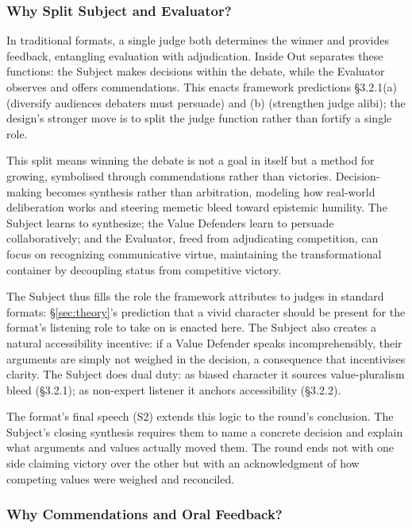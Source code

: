 \subsubsection{Why Split Subject and Evaluator?}

In traditional formats, a single judge both determines the winner and provides feedback, entangling evaluation with adjudication. Inside Out separates these functions: the Subject makes decisions within the debate, while the Evaluator observes and offers commendations. This enacts framework predictions §3.2.1(a) (diversify audiences debaters must persuade) and (b) (strengthen judge alibi); the design's stronger move is to split the judge function rather than fortify a single role.

This split means winning the debate is not a goal in itself but a method for growing, symbolised through commendations rather than victories. Decision-making becomes synthesis rather than arbitration, modeling how real-world deliberation works and steering memetic bleed toward epistemic humility. The Subject learns to synthesize; the Value Defenders learn to persuade collaboratively; and the Evaluator, freed from adjudicating competition, can focus on recognizing communicative virtue, maintaining the transformational container by decoupling status from competitive victory.

The Subject thus fills the role the framework attributes to judges in standard formats: \S\ref{sec:theory}'s prediction that a vivid character should be present for the format's listening role to take on is enacted here. The Subject also creates a natural accessibility incentive: if a Value Defender speaks incomprehensibly, their arguments are simply not weighed in the decision, a consequence that incentivises clarity. The Subject does dual duty: as biased character it sources value-pluralism bleed (§3.2.1); as non-expert listener it anchors accessibility (§3.2.2).

The format's final speech (S2) extends this logic to the round's conclusion. The Subject's closing synthesis requires them to name a concrete decision and explain what arguments and values actually moved them. The round ends not with one side claiming victory over the other but with an acknowledgment of how competing values were weighed and reconciled.

\subsubsection{Why Commendations and Oral Feedback?}

